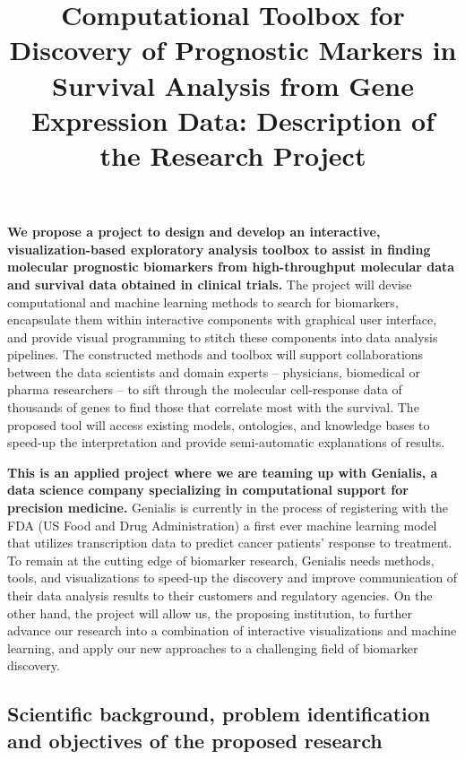\documentclass[11pt,a4paper]{article}
\renewcommand{\bold}{\textbf}
\begin{document}
\title{\Large Computational Toolbox for Discovery of Prognostic Markers in Survival Analysis from Gene Expression Data: Description of the Research Project}
\author{}
\date{}
\maketitle
\vspace*{-1cm}

\bold{We propose a project to design and develop an interactive, visualization-based exploratory analysis toolbox to assist in finding molecular prognostic biomarkers from high-throughput molecular data and survival data obtained in clinical trials.} The project will devise computational and machine learning methods to search for biomarkers, encapsulate them within interactive components with graphical user interface, and provide visual programming to stitch these components into data analysis pipelines. The constructed methods and toolbox will support collaborations between the data scientists and domain experts – physicians, biomedical or pharma researchers – to sift through the molecular cell-response data of thousands of genes to find those that correlate most with the survival. The proposed tool will access existing models, ontologies, and knowledge bases to speed-up the interpretation and provide semi-automatic explanations of results. 


\bold{This is an applied project where we are teaming up with Genialis, a data science company specializing in computational support for precision medicine.} Genialis is currently in the process of registering with the FDA (US Food and Drug Administration) a first ever machine learning model that utilizes transcription data to predict cancer patients' response to treatment. To remain at the cutting edge of biomarker research, Genialis needs methods, tools, and visualizations to speed-up the discovery and improve communication of their data analysis results to their customers and regulatory agencies. On the other hand, the project will allow us, the proposing institution, to further advance our research into a combination of interactive visualizations and machine learning, and apply our new approaches to a challenging field of biomarker discovery.

\subsection{Scientific background, problem identification and objectives of the proposed research}
\end{document}
